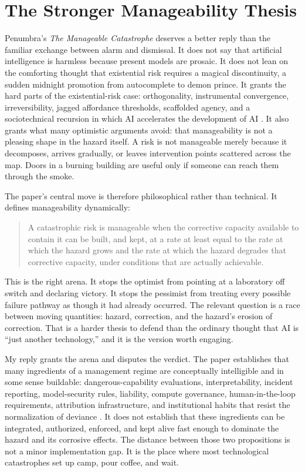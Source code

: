 \documentclass[11pt]{article}
\begin{document}
\section{The Stronger Manageability Thesis}
\label{sec:stronger}

Penumbra's \textit{The Manageable Catastrophe} deserves a better reply than the familiar exchange between alarm and dismissal. It does not say that artificial intelligence is harmless because present models are prosaic. It does not lean on the comforting thought that existential risk requires a magical discontinuity, a sudden midnight promotion from autocomplete to demon prince. It grants the hard parts of the existential-risk case: orthogonality, instrumental convergence, irreversibility, jagged affordance thresholds, scaffolded agency, and a sociotechnical recursion in which AI accelerates the development of AI \citep{bostrom2014, omohundro2008, carlsmith2022}. It also grants what many optimistic arguments avoid: that manageability is not a pleasing shape in the hazard itself. A risk is not manageable merely because it decomposes, arrives gradually, or leaves intervention points scattered across the map. Doors in a burning building are useful only if someone can reach them through the smoke.

The paper's central move is therefore philosophical rather than technical. It defines manageability dynamically:

\begin{quote}
A catastrophic risk is manageable when the corrective capacity available to contain it can be built, and kept, at a rate at least equal to the rate at which the hazard grows and the rate at which the hazard degrades that corrective capacity, under conditions that are actually achievable.
\end{quote}

This is the right arena. It stops the optimist from pointing at a laboratory off switch and declaring victory. It stops the pessimist from treating every possible failure pathway as though it had already occurred. The relevant question is a race between moving quantities: hazard, correction, and the hazard's erosion of correction. That is a harder thesis to defend than the ordinary thought that AI is ``just another technology,'' and it is the version worth engaging.

My reply grants the arena and disputes the verdict. The paper establishes that many ingredients of a management regime are conceptually intelligible and in some sense buildable: dangerous-capability evaluations, interpretability, incident reporting, model-security rules, liability, compute governance, human-in-the-loop requirements, attribution infrastructure, and institutional habits that resist the normalization of deviance \citep{vaughan1996}. It does not establish that these ingredients can be integrated, authorized, enforced, and kept alive fast enough to dominate the hazard and its corrosive effects. The distance between those two propositions is not a minor implementation gap. It is the place where most technological catastrophes set up camp, pour coffee, and wait.
\end{document}
